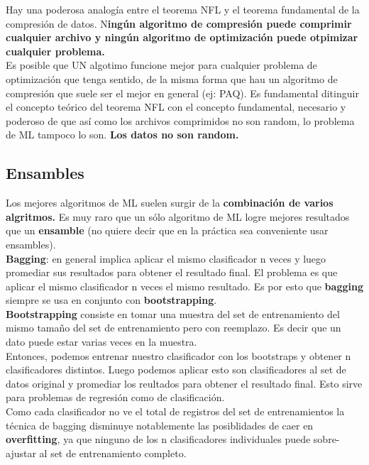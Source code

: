 \documentclass[titlepage,a4paper]{article}
\begin{document}
Hay una poderosa analogía entre el teorema NFL y el teorema fundamental de la compresión de datos. N\textbf{ingún algoritmo de compresión puede comprimir cualquier archivo y ningún algoritmo de optimización puede otpimizar cualquier problema. }\\

Es posible que UN algotimo funcione mejor para cualquier problema de optimización que tenga sentido, de la misma forma que hau un algoritmo de compresión que suele ser el mejor en general (ej: PAQ). Es fundamental ditinguir el concepto teórico del teorema NFL con el concepto fundamental, necesario y poderoso de que así como los archivos comprimidos no son random, lo problema de ML tampoco lo son. \textbf{Los datos no son random.}\\


\subsection*{Ensambles}
Los mejores algoritmos de ML suelen surgir de la \textbf{combinación de varios algritmos.} Es muy raro que un sólo algoritmo de ML logre mejores resultados que un \textbf{ensamble} (no quiere decir que en la práctica sea conveniente usar ensambles).\\

\textbf{Bagging}: en general implica aplicar el mismo clasificador n veces y luego promediar sus resultados para obtener el resultado final. El problema es que aplicar el mismo clasificador n veces el mismo resultado. Es por esto que \textbf{bagging} siempre se usa en conjunto con \textbf{bootstrapping}.\\

\textbf{Bootstrapping} consiste en tomar una muestra del set de entrenamiento del mismo tamaño del set de entrenamiento pero con reemplazo. Es decir que un dato puede estar varias veces en la muestra. \\

Entonces, podemos entrenar nuestro clasificador con los bootstraps y obtener n clasificadores distintos. Luego podemos aplicar esto son clasificadores al set de datos original y promediar los reultados para obtener el resultado final. Esto sirve para problemas de regresión como de clasificación. \\

Como cada clasificador no ve el total de registros del set de entrenamientos la técnica de bagging disminuye notablemente las posiblidades de caer en \textbf{overfitting}, ya que ninguno de los n clasificadores individuales puede sobre-ajustar al set de entrenamiento completo. \\
\end{document}
